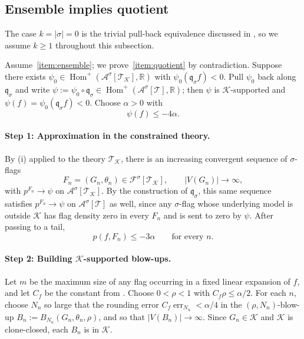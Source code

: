 \documentclass[11pt]{article}
\theoremstyle{definition}
\newcommand{\R}{\mathbb{R}}
\newcommand{\A}{\mathcal{A}}
\newcommand{\F}{\mathcal{F}}
\newcommand{\K}{\mathcal{K}}
\newcommand{\T}{\mathcal{T}}
\newcommand{\Homp}{\operatorname{Hom}^{+}}
\newcommand{\q}{\mathfrak{q}}
\begin{document}
\subsection{Ensemble implies quotient}

The case $k=|\sigma|=0$ is the trivial pull-back equivalence
discussed in , so we assume $k\ge 1$
throughout this subsection.

Assume~\ref{item:ensemble}; we prove~\ref{item:quotient} by
contradiction.  Suppose there exists
$\psi_0\in\Homp(\A^\sigma[\T_\K],\R)$ with $\psi_0(\q_\sigma f)<0$.
Pull $\psi_0$ back along $\q_\sigma$ and write
$\psi:=\psi_0\circ\q_\sigma\in\Homp(\A^\sigma[\T],\R)$; then $\psi$ is
$\K$-supported and $\psi(f)=\psi_0(\q_\sigma f)<0$.  Choose $\alpha>0$
with
\begin{equation}\label{eq:negative-margin}
  \psi(f)\le-4\alpha.
\end{equation}

\paragraph{Step 1: Approximation in the constrained theory.}
By (i) applied to the theory $\T_\K$, there is an
increasing convergent sequence of $\sigma$-flags
\[
  F_n=(G_n,\theta_n)\in\F^\sigma[\T_\K],\qquad|V(G_n)|\to\infty,
\]
with $p^{F_n}\to\psi$ on $\A^\sigma[\T_\K]$.  By the construction of
$\q_\sigma$, this same sequence satisfies $p^{F_n}\to\psi$ on
$\A^\sigma[\T]$ as well, since any $\sigma$-flag whose underlying model
is outside $\K$ has flag density zero in every $F_n$ and is sent to zero
by $\psi$.  After passing to a tail,
\begin{equation}\label{eq:finite-negative}
  p(f,F_n)\le-3\alpha
  \qquad\text{for every }n.
\end{equation}

\paragraph{Step 2: Building $\K$-supported blow-ups.}
Let $m$ be the maximum size of any flag occurring in a fixed linear
expansion of $f$, and let $C_f$ be the constant from
.  Choose $0<\rho<1$ with $C_f\rho\le\alpha/2$.  For
each $n$, choose $N_n$ so large that the rounding error
$C_f\operatorname{err}_{N_n}<\alpha/4$ in the $(\rho,N_n)$-blow-up
$B_n:=B_{N_n}(G_n,\theta_n,\rho)$, and so that $|V(B_n)|\to\infty$.
Since $G_n\in\K$ and $\K$ is clone-closed, each $B_n$ is in $\K$.
\end{document}

